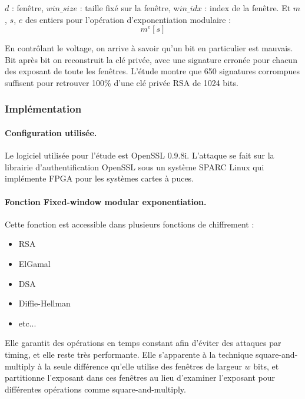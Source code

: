 			$d$ : fenêtre, $win\_size$ : taille fixé sur la fenêtre, w$in\_idx$ : index de la fenêtre. Et $m$, $s$, $e$ des entiers pour l'opération d'exponentiation modulaire :
			$$ m^e [s]$$

			En contrôlant le voltage, on arrive à savoir qu'un bit en particulier est mauvais. Bit après bit on reconstruit la clé privée, avec une signature erronée pour chacun des exposant de toute les fenêtres. L'étude montre que 650 signatures corrompues suffisent pour retrouver 100\% d'une clé privée RSA de 1024 bits. 

		
		\subsubsection{Implémentation}
			
			\paragraph{Configuration utilisée.\\}
			
			Le logiciel utilisée pour l'étude est OpenSSL 0.9.8i. L'attaque se fait sur la librairie d'authentification OpenSSL sous un système SPARC Linux qui implémente FPGA pour les systèmes cartes à puces.

			\paragraph{Fonction Fixed-window modular exponentiation.\\}

			Cette fonction est accessible dans plusieurs fonctions de chiffrement :
			\begin{itemize}
			\item RSA
			\item ElGamal
			\item DSA
			\item Diffie-Hellman
			\item etc...
			\end{itemize}
		
			Elle garantit des opérations en temps constant afin d'éviter des attaques par timing, et elle reste très performante. Elle s'apparente à la technique square-and-multiply à la seule différence qu'elle utilise des fenêtres de largeur $w$ bits, et partitionne l'exposant dans ces fenêtres au lieu d'examiner l'exposant pour différentes opérations comme square-and-multiply. \\


